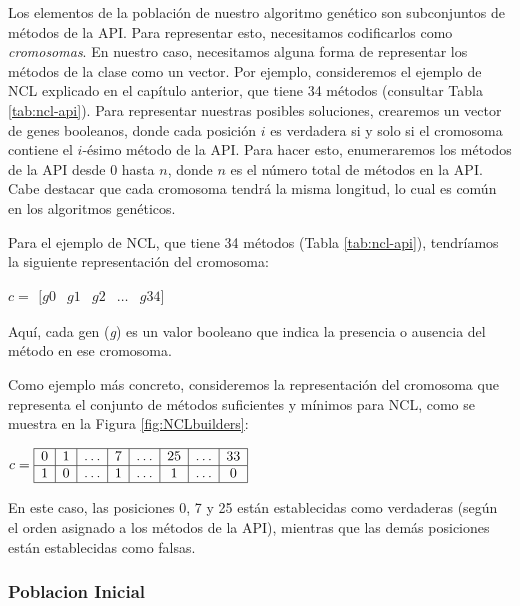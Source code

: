 Los elementos de la población de nuestro algoritmo genético son subconjuntos de métodos de la API. Para representar esto, necesitamos codificarlos como \emph{cromosomas}. En nuestro caso, necesitamos alguna forma de representar los métodos de la clase como un vector. Por ejemplo, consideremos el ejemplo de NCL explicado en el capítulo anterior, que tiene 34 métodos (consultar Tabla \ref{tab:ncl-api}). Para representar nuestras posibles soluciones, crearemos un vector de genes booleanos, donde cada posición $i$ es verdadera si y solo si el cromosoma contiene el $i$-ésimo método de la API. Para hacer esto, enumeraremos los métodos de la API desde 0 hasta $n$, donde $n$ es el número total de métodos en la API. Cabe destacar que cada cromosoma tendrá la misma longitud, lo cual es común en los algoritmos genéticos.

Para el ejemplo de NCL, que tiene 34 métodos (Tabla \ref{tab:ncl-api}), tendríamos la siguiente representación del cromosoma:

\begin{center}
$c = \begin{array}{ccccccc}
[ g0 & g1 & g2 & \ldots & g34 ]
\end{array}$
\end{center}

Aquí, cada gen (\emph{g}) es un valor booleano que indica la presencia o ausencia del método en ese cromosoma.

Como ejemplo más concreto, consideremos la representación del cromosoma que representa el conjunto de métodos suficientes y mínimos para NCL, como se muestra en la Figura \ref{fig:NCLbuilders}:
\begin{center}
$c = \begin{array}{|*{8}{c|}}
\hline
0 & 1 & \ldots & 7 & \ldots & 25 & \ldots & 33 \\
\hline
1 & 0 & \ldots & 1 & \ldots & 1 & \ldots & 0 \\
\hline
\end{array}$
\end{center}

En este caso, las posiciones 0, 7 y 25 están establecidas como verdaderas (según el orden asignado a los métodos de la API), mientras que las demás posiciones están establecidas como falsas.


\subsubsection{Poblacion Inicial}

